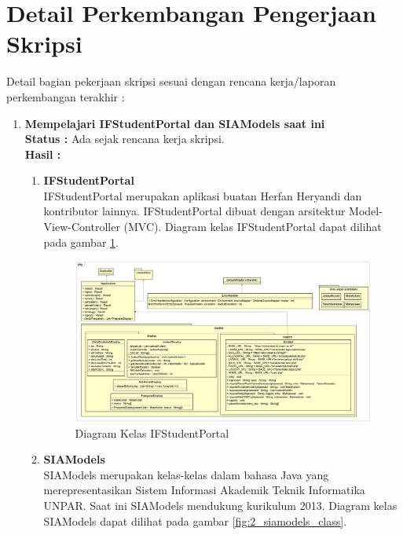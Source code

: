 \documentclass[a4paper,twoside]{article}
\begin{document}
\section{Detail Perkembangan Pengerjaan Skripsi}
Detail bagian pekerjaan skripsi sesuai dengan rencana kerja/laporan perkembangan terakhir :
	\begin{enumerate}
		\item \textbf{Mempelajari IFStudentPortal dan SIAModels saat ini}\\
		{\bf Status :} Ada sejak rencana kerja skripsi.\\
		{\bf Hasil :} 
		\begin{enumerate}
			\item \textbf{IFStudentPortal} \\
			IFStudentPortal merupakan aplikasi buatan Herfan Heryandi dan kontributor lainnya. IFStudentPortal dibuat dengan arsitektur Model-View-Controller (MVC). Diagram kelas IFStudentPortal dapat dilihat pada gambar \ref{fig:2_ifstudentportal_class}.
			
			\begin{figure}[H]
			\centering
			\includegraphics[scale=0.135]{Gambar/class-diagram-ifstudentportal}
			\caption{Diagram Kelas IFStudentPortal}
			\label{fig:2_ifstudentportal_class}
			\end{figure}

			\item \textbf{SIAModels} \\
			SIAModels merupakan kelas-kelas dalam bahasa Java yang merepresentasikan Sistem Informasi Akademik Teknik Informatika UNPAR. Saat ini SIAModels mendukung kurikulum 2013. Diagram kelas SIAModels dapat dilihat pada gambar \ref{fig:2_siamodels_class}.
			

\end{enumerate}
\end{enumerate}
\end{document}
